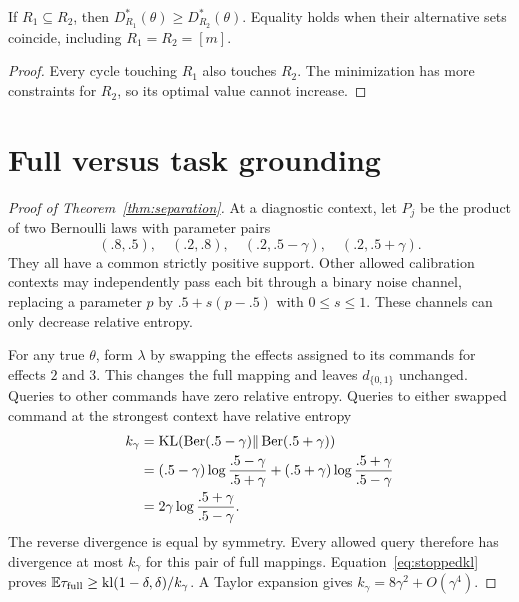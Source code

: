 \begin{corollary}
If $R_1\subseteq R_2$, then $D_{R_1}^*(\theta)\ge D_{R_2}^*(\theta)$. Equality holds when their alternative sets coincide, including $R_1=R_2=[m]$.
\end{corollary}
\begin{proof}
Every cycle touching $R_1$ also touches $R_2$. The minimization has more constraints for $R_2$, so its optimal value cannot increase.
\end{proof}

\section{Full versus task grounding}\label{app:separation}
\begin{proof}[Proof of Theorem~\ref{thm:separation}]
At a diagnostic context, let $P_j$ be the product of two Bernoulli laws with parameter pairs
\begin{equation}
(.8,.5),\quad(.2,.8),\quad(.2,.5-\gamma),\quad(.2,.5+\gamma).
\end{equation}
They all have a common strictly positive support. Other allowed calibration contexts may independently pass each bit through a binary noise channel, replacing a parameter $p$ by $.5+s(p-.5)$ with $0\le s\le1$. These channels can only decrease relative entropy.

For any true $\theta$, form $\lambda$ by swapping the effects assigned to its commands for effects $2$ and $3$. This changes the full mapping and leaves $d_{\{0,1\}}$ unchanged. Queries to other commands have zero relative entropy. Queries to either swapped command at the strongest context have relative entropy
\begin{align}
k_\gamma
&=\operatorname{KL}(\operatorname{Ber}(.5-\gamma)\Vert\operatorname{Ber}(.5+\gamma))\\
&=(.5-\gamma)\log\frac{.5-\gamma}{.5+\gamma}
 +(.5+\gamma)\log\frac{.5+\gamma}{.5-\gamma}\\
&=2\gamma\log\frac{.5+\gamma}{.5-\gamma}.
\end{align}
The reverse divergence is equal by symmetry. Every allowed query therefore has divergence at most $k_\gamma$ for this pair of full mappings. Equation~\eqref{eq:stoppedkl} proves $\mathbb E\tau_{\rm full}\ge\operatorname{kl}(1-\delta,\delta)/k_\gamma$. A Taylor expansion gives $k_\gamma=8\gamma^2+O(\gamma^4)$.


\end{proof}
